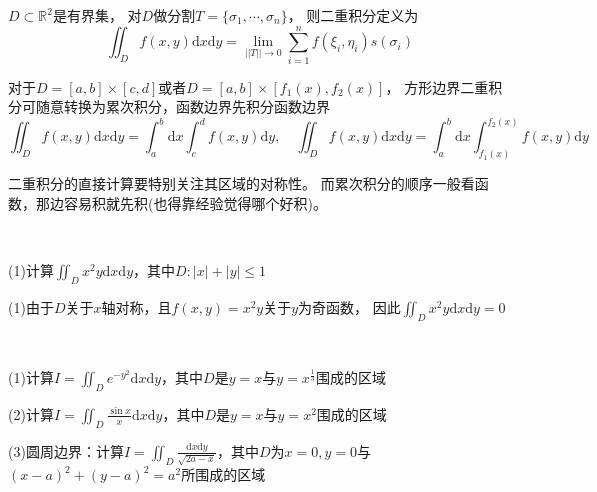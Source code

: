 \begin{definition}[二重积分]
  $D \subset \mathbb{R}^2$是有界集，
  对$D$做分割$T = \{\sigma_1,\cdots,\sigma_n\}$，
  则二重积分定义为
  \begin{equation*}
    \iint _D f(x,y) \mathrm{d}x\mathrm{d}y = \lim \limits _{||T|| \rightarrow 0}\sum\limits_{i = 1}^n f(\xi_i,\eta_i) s(\sigma_i) 
  \end{equation*}
\end{definition}

\begin{theorem}[二重积分与累次积分]
  对于$D = [a,b] \times [c,d]$或者$D = [a,b] \times [f_1(x),f_2(x)]$，
  方形边界二重积分可随意转换为累次积分，函数边界先积分函数边界
  \begin{equation*}
    \iint _D f(x,y) \mathrm{d}x \mathrm{d}y = \int ^b_a \mathrm{d}x \int^d_c f(x,y)\mathrm{d}y , \quad \iint_D f(x,y) \mathrm{d}x\mathrm{d}y = \int ^b_a \mathrm{d}x \int^{f_2(x)}_{f_1(x)}f(x,y)\mathrm{d}y
  \end{equation*}
\end{theorem}

\begin{note}
  二重积分的直接计算要特别关注其区域的对称性。
  而累次积分的顺序一般看函数，那边容易积就先积(也得靠经验觉得哪个好积)。
\end{note}

~

\begin{exercise}[对称性计算]
  (1)计算$\iint_D x^2y \mathrm{d}x\mathrm{d}y$，其中$D: |x| + |y| \leq 1$
\end{exercise}

\begin{solution}
  (1)由于$D$关于$x$轴对称，且$f(x,y) = x^2y$关于$y$为奇函数，
  因此$\iint_D x^2 y\mathrm{d}x \mathrm{d}y = 0$
\end{solution}

~

\begin{exercise}[转换为累次积分]
  (1)计算$I = \iint _D e^{-y^2}\mathrm{d}x\mathrm{d}y$，其中$D$是$y = x$与$y = x^{\frac{1}{3}}$围成的区域

  (2)计算$I = \iint _D \frac{\sin x}{x} \mathrm{d}x\mathrm{d}y$，其中$D$是$y = x$与$y = x^2$围成的区域

  (3)圆周边界：计算$I = \iint _D \frac{\mathrm{d}x\mathrm{d}y}{\sqrt{2a - x}}$，其中$D$为$x = 0, y = 0$与$(x - a)^2 + (y - a)^2 = a^2$所围成的区域
\end{exercise}

